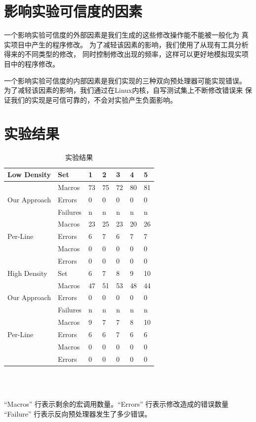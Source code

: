 \section{影响实验可信度的因素}
一个影响实验可信度的外部因素是我们生成的这些修改操作能不能被一般化为
真实项目中产生的程序修改。
为了减轻该因素的影响，我们使用了从现有工具分析得来的不同类型的修改，
同时控制修改出现的频率，这样可以更好地模拟现实项目中的程序修改。

一个影响实验可信度的内部因素是我们实现的三种双向预处理器可能实现错误。
为了减轻该因素的影响，我们通过在Linux内核，自写测试集上不断修改错误来
保证我们的实现是可信可靠的，不会对实验产生负面影响。

\section{实验结果}
\begin{table}[htbp]
  \caption{实验结果}\label{tbl:results}
\centering
\begin{tabular}{|l|l|lllll|}
  \hline
  Low Density & Set & 1 & 2 & 3 & 4 & 5\\
  \hline
  \multirow{3}{*}{Our Approach} &  Macros & 73 & 75 & 72 & 80 & 81 \\
  \cline{2-7}
              &Errors & 0 & 0 & 0 & 0 & 0  \\
  \cline{2-7}
              & Failures & n & n & n & n & n \\
  \hline
  \multirow{3}{*}{Per-Line} & Macros & 23 & 25 & 23 & 20 & 26 \\
  \cline{2-7}
              & Errors & 6 & 7 & 6 & 7 & 7  \\
  \hline
  \multirow{3}{*}{Per-File} & Macros & 0 & 0 & 0 & 0 & 0  \\
  \cline{2-7}
              & Errors & 0 & 0 & 0 & 0 & 0 \\
  \hline
  \hline
  High Density & Set & 6 & 7 & 8& 9& 10\\
  \hline
  \multirow{3}{*}{Our Approach} &Macros & 47 & 51 & 53 & 48 & 44 \\
  \cline{2-7}
              &  Errors & 0 & 0 & 0 & 0 & 0  \\
  \cline{2-7}
              & Failures & n & n & n & n & n \\
  \hline
  \multirow{3}{*}{Per-Line} & Macros & 9 & 7 & 7 & 8 & 10  \\
  \cline{2-7}
              & Errors & 6 & 6 & 7 & 6 & 6 \\
  \hline
  \multirow{3}{*}{Per-File} & Macros & 0 & 0 & 0 & 0 & 0  \\
  \cline{2-7}
              & Errors & 0 & 0 & 0 & 0 & 0 \\
  \hline\end{tabular}
\\
\parbox{\columnwidth}{ \ \\
\footnotesize ``Macros'' 行表示剩余的宏调用数量。``Errors'' 行表示修改造成的错误数量
      ``Failure'' 行表示反向预处理器发生了多少错误。}
\end{table}

